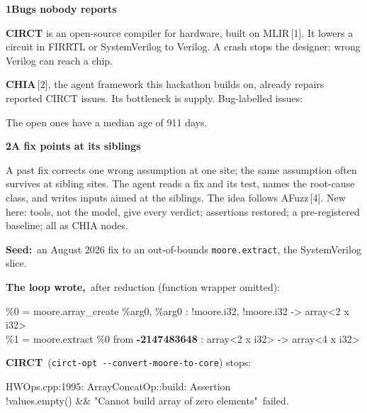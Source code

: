 \documentclass{article}
\newcommand{\body}{\fontsize{31}{41}\selectfont}
\renewcommand{\small}{\fontsize{27}{35}\selectfont}
\newcommand{\mono}{\fontsize{26}{34}\selectfont\ttfamily}
\newcommand{\sect}[2]{\par{\fontsize{54}{62}\selectfont\bfseries\color{agB}#1\hspace{0.4em}\color{ink}#2\par}%
  \nointerlineskip\vspace{0.14in}{\color{agB}\hrule height 5pt}\vspace{0.02in}}
\newcommand{\code}[1]{\texttt{#1}}
\newenvironment{col}[1]{\begin{minipage}[t]{#1}\raggedright\body\setlength{\parskip}{0.22in}}{\end{minipage}}
\newcommand{\rowgap}{\par\vspace{0.42in}}
\begin{document}
\rowgap
\begin{col}{13.2in}
\sect{1}{Bugs nobody reports}
\textbf{CIRCT} is an open-source compiler for hardware, built on MLIR\,[1]. It lowers a circuit in FIRRTL or SystemVerilog to Verilog. A crash stops the designer; wrong Verilog can reach a chip.

\textbf{CHIA}\,[2], the agent framework this hackathon builds on, already repairs reported CIRCT issues. Its bottleneck is supply. Bug-labelled issues:


\vspace{-0.1in}
{\small\color{mute}The open ones have a median age of 911 days.\par}
\end{col}\hfill
\begin{col}{19.9in}
\sect{2}{A fix points at its siblings}
A past fix corrects one wrong assumption at one site; the same assumption often survives at sibling sites. The agent reads a fix and its test, names the root-cause class, and writes inputs aimed at the siblings. The idea follows AFuzz\,[4]. New here: tools, not the model, give every verdict; assertions restored; a pre-registered baseline; all as CHIA nodes.

\begin{tcolorbox}[colback=white,colframe=agB,arc=0.15in,boxrule=4pt,left=0.45in,right=0.4in,top=0.28in,bottom=0.28in]
\raggedright
{\small\textbf{\color{agB}Seed:}\ an August 2026 fix to an out-of-bounds \code{moore.extract}, the SystemVerilog slice.\par}
\vspace{0.16in}
{\small\textbf{\color{agB}The loop wrote,}\ after reduction (function wrapper omitted):\par}
\vspace{0.08in}
{\mono
\%0 = moore.array\_create \%arg0, \%arg0 : !moore.i32, !moore.i32 -> array<2 x i32>\\
\%1 = moore.extract \%0 from {\color{agB}\bfseries-2147483648} : array<2 x i32> -> array<4 x i32>\par}
\vspace{0.16in}
{\small\textbf{\color{agB}CIRCT}\ (\code{circt-opt -{}-convert-moore-to-core}) stops:\par}
\vspace{0.08in}
{\mono HWOps.cpp:1995: ArrayConcatOp::build: Assertion\\
\textasciigrave!values.empty() \&\& "Cannot build array of zero elements"\textquotesingle\ failed.\par}
\end{tcolorbox}
\end{col}
\end{document}
